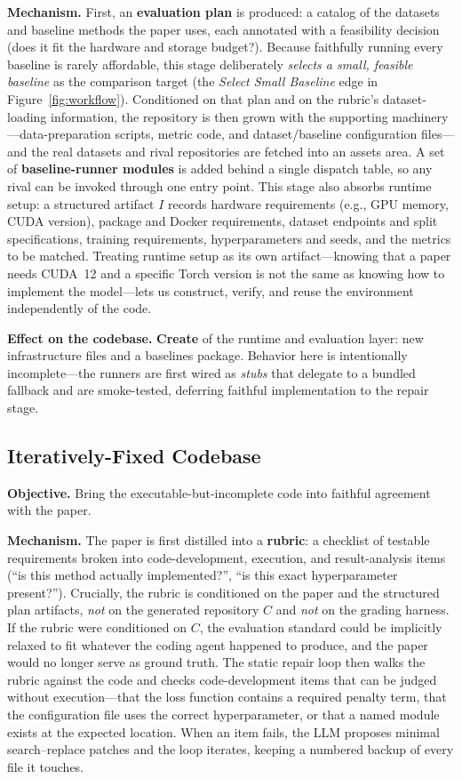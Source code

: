 \documentclass[11pt]{article}
\begin{document}
\textbf{Mechanism.} First, an \textbf{evaluation plan} is produced: a catalog of the datasets and baseline methods the paper uses, each annotated with a feasibility decision (does it fit the hardware and storage budget?). Because faithfully running every baseline is rarely affordable, this stage deliberately \emph{selects a small, feasible baseline} as the comparison target (the \emph{Select Small Baseline} edge in Figure~\ref{fig:workflow}). Conditioned on that plan and on the rubric's dataset-loading information, the repository is then grown with the supporting machinery---data-preparation scripts, metric code, and dataset/baseline configuration files---and the real datasets and rival repositories are fetched into an assets area. A set of \textbf{baseline-runner modules} is added behind a single dispatch table, so any rival can be invoked through one entry point. This stage also absorbs runtime setup: a structured artifact $I$ records hardware requirements (e.g., GPU memory, CUDA version), package and Docker requirements, dataset endpoints and split specifications, training requirements, hyperparameters and seeds, and the metrics to be matched. Treating runtime setup as its own artifact---knowing that a paper needs CUDA~12 and a specific Torch version is not the same as knowing how to implement the model---lets us construct, verify, and reuse the environment independently of the code.

\textbf{Effect on the codebase.} \textbf{Create} of the runtime and evaluation layer: new infrastructure files and a baselines package. Behavior here is intentionally incomplete---the runners are first wired as \emph{stubs} that delegate to a bundled fallback and are smoke-tested, deferring faithful implementation to the repair stage.

\subsection{Iteratively-Fixed Codebase}

\textbf{Objective.} Bring the executable-but-incomplete code into faithful agreement with the paper.

\textbf{Mechanism.} The paper is first distilled into a \textbf{rubric}: a checklist of testable requirements broken into code-development, execution, and result-analysis items (``is this method actually implemented?'', ``is this exact hyperparameter present?''). Crucially, the rubric is conditioned on the paper and the structured plan artifacts, \emph{not} on the generated repository $C$ and \emph{not} on the grading harness. If the rubric were conditioned on $C$, the evaluation standard could be implicitly relaxed to fit whatever the coding agent happened to produce, and the paper would no longer serve as ground truth. The static repair loop then walks the rubric against the code and checks code-development items that can be judged without execution---that the loss function contains a required penalty term, that the configuration file uses the correct hyperparameter, or that a named module exists at the expected location. When an item fails, the LLM proposes minimal search--replace patches and the loop iterates, keeping a numbered backup of every file it touches.
\end{document}
